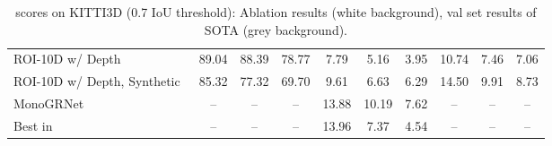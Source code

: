 \documentclass[10pt,twocolumn,letterpaper]{article}
\begin{document}
\begin{table*}[t]
{\begin{tabular}{l|ccc|ccc|ccc}
        \rowcolor[gray]{\gc}
        ROI-10D w/ Depth~\cite{Manhardt_2019_CVPR} & 89.04 & 88.39 & 78.77 & 7.79 & 5.16 & 3.95 & 10.74 & 7.46 & 7.06 \\
        \rowcolor[gray]{\gc}
        ROI-10D w/ Depth, Synthetic~\cite{Manhardt_2019_CVPR} & 85.32 & 77.32 & 69.70 & 9.61 & 6.63 & 6.29 & 14.50 & 9.91 & 8.73 \\
        \rowcolor[gray]{\gc}
        MonoGRNet~\cite{qin2019monogrnet} & -- & -- & -- & 13.88 & 10.19 & 7.62 & -- & -- & -- \\
        \rowcolor[gray]{\gc}
        Best in~\cite{Barabanau_arXiv_2019} & -- & -- & -- & 13.96 & 7.37 & 4.54 & -- & -- & -- \\
        \bottomrule
    \end{tabular}}
    \vspace{-0.5em}
    \caption{ scores on KITTI3D (0.7 IoU threshold): Ablation results (white background), val set results of SOTA (grey background).}
    \label{tab:ablation-old-metric}
    \vspace{-1em}
\end{table*}
\end{document}
